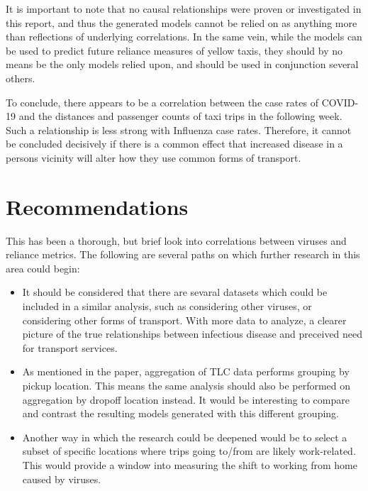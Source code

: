 \documentclass[11pt]{article}
\begin{document}
It is important to note that no causal relationships were proven or investigated in this report,
and thus the generated models cannot be relied on as anything more than reflections
of underlying correlations. In the same vein, while the models can be used to predict future reliance measures of yellow taxis,
they should by no means be the only models relied upon, and should be used in conjunction several others.

To conclude, there appears to be a correlation between the case rates of COVID-19
and the distances and passenger counts of taxi trips in the following week.
Such a relationship is less strong with Influenza case rates. Therefore,
it cannot be concluded decisively if there is a common effect that increased disease 
in a persons vicinity will alter how they use common forms of transport.

\section{Recommendations}
This has been a thorough, but brief look into correlations between viruses and reliance metrics.
The following are several paths on which further research in this area could begin:
\begin{itemize}
    \item It should be considered that there are sevaral datasets which could be included
    in a similar analysis, such as considering other viruses, or considering other forms of transport.
    With more data to analyze, a clearer picture of the true relationships between infectious disease and preceived need for transport services.
    \item As mentioned in the paper, aggregation of TLC data performs grouping by pickup location.
    This means the same analysis should also be performed on aggregation by dropoff location instead.
    It would be interesting to compare and contrast the resulting models generated with this different grouping.
    \item Another way in which the research could be deepened would be to select a subset of specific locations where trips going to/from are likely work-related. 
    This would provide a window into measuring the shift to working from home caused by viruses.
\end{itemize}

\clearpage

\printbibliography
\end{document}
